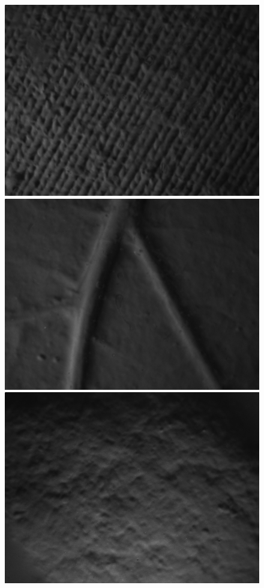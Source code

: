 \documentclass[10pt,twocolumn,letterpaper]{article}
\begin{document}
\begin{figure}[h]
\includegraphics[width=\linewidth]{images/fabric.png}
\endminipage\hfill
{}
\includegraphics[width=\linewidth]{images/foliage.png}
\endminipage\hfill
{}
\includegraphics[width=\linewidth]{images/stone.png}

\end{figure}
\end{document}
